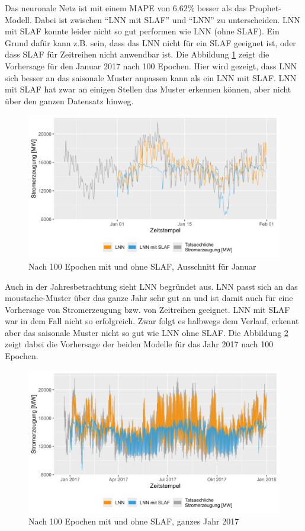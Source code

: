 \documentclass[11pt,ngerman,a4paper,]{article}
\begin{document}
Das neuronale Netz ist mit einem MAPE von 6.62\% besser als das Prophet-Modell. Dabei ist zwischen ``LNN mit SLAF'' und ``LNN'' zu unterscheiden. LNN mit SLAF konnte leider nicht so gut performen wie LNN (ohne SLAF). Ein Grund dafür kann z.B. sein, dass das LNN nicht für ein SLAF geeignet ist, oder dass SLAF für Zeitreihen nicht anwendbar ist. Die Abbildung \ref{fig:slaf_lnn_100_epochs_january} zeigt die Vorhersage für den Januar 2017 nach 100 Epochen. Hier wird gezeigt, dass LNN sich besser an das saisonale Muster anpassen kann als ein LNN mit SLAF. LNN mit SLAF hat zwar an einigen Stellen das Muster erkennen können, aber nicht über den ganzen Datensatz hinweg.

\begin{figure}[H]
\centering
\includegraphics[width=1.0\textwidth]{plots/cobmined_nnLNN.png}
\caption{Nach 100 Epochen mit und ohne SLAF, Ausschnitt für Januar}
\label{fig:slaf_lnn_100_epochs_january}
\end{figure}

Auch in der Jahresbetrachtung sieht LNN begründet aus. LNN passt sich an das moustache-Muster über das ganze Jahr sehr gut an
und ist damit auch für eine Vorhersage von Stromerzeugung bzw. von Zeitreihen geeignet. LNN mit SLAF war in dem Fall nicht so erfolgreich. Zwar folgt es halbwegs dem Verlauf, erkennt aber das saisonale Muster nicht so gut wie LNN ohne SLAF. Die Abbildung \ref{fig:slaf_lnn_100_epochs_2017} zeigt dabei die Vorhersage der beiden Modelle für das Jahr 2017 nach 100 Epochen.

\begin{figure}[H]
\centering
\includegraphics[width=1.0\textwidth]{plots/all_time_cobmined_nnLNN.png}
\caption{Nach 100 Epochen mit und ohne SLAF, ganzes Jahr 2017}
\label{fig:slaf_lnn_100_epochs_2017}
\end{figure}
\end{document}
